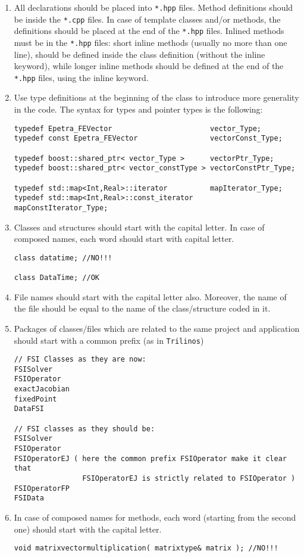 \documentclass[10p]{article}
\begin{document}
\begin{enumerate}
  \item All declarations should be placed into \texttt{*.hpp} files. Method definitions should be inside the \texttt{*.cpp} files. In case of template classes and/or methods, the definitions should be placed at the end of the \texttt{*.hpp} files. Inlined methods must be in the \texttt{*.hpp} files: short inline methods (usually no more than one line), should be defined inside the class definition (without the inline keyword), while longer inline methods should be defined at the end of the \texttt{*.hpp} files, using the inline keyword.
  \item Use type definitions at the beginning of the class to introduce more generality in the code. The syntax for types and pointer types is the following:
\begin{lstlisting}
typedef Epetra_FEVector                       vector_Type;
typedef const Epetra_FEVector                 vectorConst_Type;

typedef boost::shared_ptr< vector_Type >      vectorPtr_Type;
typedef boost::shared_ptr< vector_constType > vectorConstPtr_Type;

typedef std::map<Int,Real>::iterator          mapIterator_Type;
typedef std::map<Int,Real>::const_iterator    mapConstIterator_Type;
\end{lstlisting}
  \item Classes and structures should start with the capital letter. In case of composed names, each word should start with capital letter.
\begin{lstlisting}
class datatime; //NO!!!

class DataTime; //OK
\end{lstlisting}
  \item File names should start with the capital letter also. Moreover, the name of the file should be equal to the name of the class/structure coded in it.
  \item Packages of classes/files which are related to the same project and application should start with a common prefix
  (as in \texttt{Trilinos})
\begin{lstlisting}
// FSI Classes as they are now:
FSISolver
FSIOperator
exactJacobian
fixedPoint
DataFSI

// FSI classes as they should be:
FSISolver
FSIOperator
FSIOperatorEJ ( here the common prefix FSIOperator make it clear that
                FSIOperatorEJ is strictly related to FSIOperator )
FSIOperatorFP
FSIData
\end{lstlisting}
  \item In case of composed names for methods, each word (starting from the second one) should start with the capital letter.
\begin{lstlisting}
void matrixvectormultiplication( matrixtype& matrix ); //NO!!!


\end{lstlisting}
\end{enumerate}
\end{document}
